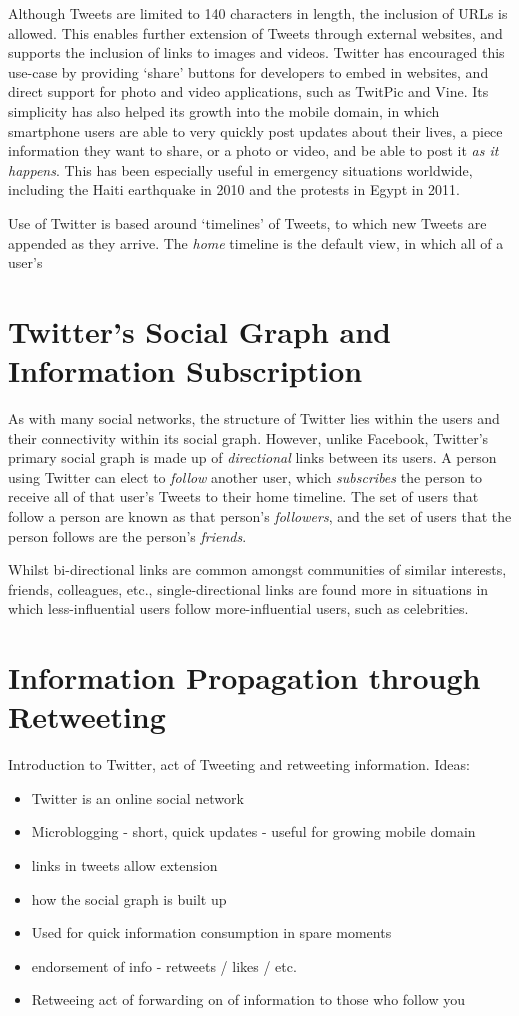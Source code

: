 Although Tweets are limited to 140 characters in length, the inclusion of URLs is allowed. This enables further extension of Tweets through external websites, and supports the inclusion of links to images and videos. Twitter has encouraged this use-case by providing `share' buttons for developers to embed in websites, and direct support for photo and video applications, such as TwitPic and Vine.
Its simplicity has also helped its growth into the mobile domain, in which smartphone users are able to very quickly post updates about their lives, a piece information they want to share, or a photo or video, and be able to post it \textit{as it happens}. This has been especially useful in emergency situations worldwide, including the Haiti earthquake in 2010 and the protests in Egypt in 2011.

Use of Twitter is based around `timelines' of Tweets, to which new Tweets are appended as they arrive. The \textit{home} timeline is the default view, in which all of a user's

\section{Twitter's Social Graph and Information Subscription}
As with many social networks, the structure of Twitter lies within the users and their connectivity within its social graph. However, unlike Facebook, Twitter's primary social graph is made up of \textit{directional} links between its users. A person using Twitter can elect to \textit{follow} another user, which \textit{subscribes} the person to receive all of that user's Tweets to their home timeline. The set of users that follow a person are known as that person's \textit{followers}, and the set of users that the person follows are the person's \textit{friends}.

Whilst bi-directional links are common amongst communities of similar interests, friends, colleagues, etc., single-directional links are found more in situations in which less-influential users follow more-influential users, such as celebrities.

\section{Information Propagation through Retweeting}

Introduction to Twitter, act of Tweeting and retweeting information. Ideas:
\begin{itemize}
\item Twitter is an online social network
\item Microblogging - short, quick updates - useful for growing mobile domain
\item links in tweets allow extension
\item how the social graph is built up
\item Used for quick information consumption in spare moments
\item endorsement of info - retweets / likes / etc.
\item Retweeing act of forwarding on of information to those who follow you
\end{itemize}

